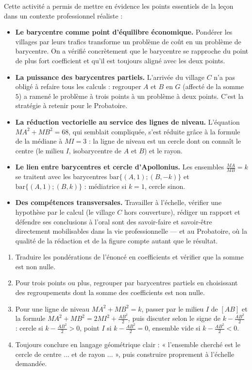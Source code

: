 \documentclass[11pt]{article}
\newcounter{popsec}
\newcounter{popsub}
\newcommand{\courssub}[1]{%
  \stepcounter{popsub}%
  \par\vspace{9pt}\noindent{\popxbold\fontsize{11.5}{13}\selectfont\color{popink}{\color{poporange}\thepopsec.\thepopsub}\hspace{6pt}#1}\par\nopagebreak\vspace{4pt}
}
\begin{document}
\courssub{Bilan de l'activité}

Cette activité a permis de mettre en évidence les points essentiels de la leçon dans un contexte professionnel réaliste :

\begin{itemize}
\item \textbf{Le barycentre comme point d'équilibre économique.} Pondérer les villages par leurs trafics transforme un problème de coût en un problème de barycentre. On a vérifié concrètement que le barycentre se rapproche du point de plus fort coefficient et qu'il est toujours aligné avec les deux points.
\item \textbf{La puissance des barycentres partiels.} L'arrivée du village $C$ n'a pas obligé à refaire tous les calculs : regrouper $A$ et $B$ en $G$ (affecté de la somme $5$) a ramené le problème à trois points à un problème à deux points. C'est la stratégie à retenir pour le Probatoire.
\item \textbf{La réduction vectorielle au service des lignes de niveau.} L'équation $MA^2 + MB^2 = 68$, qui semblait compliquée, s'est réduite grâce à la formule de la médiane à $MI = 3$ : la ligne de niveau est un cercle dont on connaît le centre (le milieu $I$, isobarycentre de $A$ et $B$) et le rayon.
\item \textbf{Le lien entre barycentres et cercle d'Apollonius.} Les ensembles $\frac{MA}{MB} = k$ se traitent avec les barycentres $\mathrm{bar}\{(A,1);(B,-k)\}$ et $\mathrm{bar}\{(A,1);(B,k)\}$ : médiatrice si $k = 1$, cercle sinon.
\item \textbf{Des compétences transversales.} Travailler à l'échelle, vérifier une hypothèse par le calcul (le village $C$ hors couverture), rédiger un rapport et défendre ses conclusions à l'oral sont des savoir-faire et savoir-être directement mobilisables dans la vie professionnelle — et au Probatoire, où la qualité de la rédaction et de la figure compte autant que le résultat.
\end{itemize}

\begin{methode}
\begin{enumerate}
\item Traduire les pondérations de l'énoncé en coefficients et vérifier que la somme est non nulle.
\item Pour trois points ou plus, regrouper par barycentres partiels en choisissant des regroupements dont la somme des coefficients est non nulle.
\item Pour une ligne de niveau $MA^2 + MB^2 = k$, passer par le milieu $I$ de $[AB]$ et la formule $MA^2 + MB^2 = 2MI^2 + \frac{AB^2}{2}$, puis discuter selon le signe de $k - \frac{AB^2}{2}$ : cercle si $k - \frac{AB^2}{2} > 0$, point $I$ si $k - \frac{AB^2}{2} = 0$, ensemble vide si $k - \frac{AB^2}{2} < 0$.
\item Toujours conclure en langage géométrique clair : « l'ensemble cherché est le cercle de centre ... et de rayon ... », puis construire proprement à l'échelle demandée.
\end{enumerate}
\end{methode}
\end{document}
